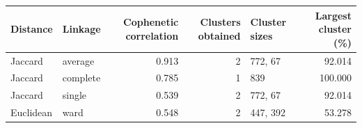 \begin{tabular}{llrrlr}
\toprule
\textbf{Distance} & \textbf{Linkage} & \textbf{Cophenetic correlation} & \textbf{Clusters obtained} & \textbf{Cluster sizes} & \textbf{Largest cluster (\%)} \\
\midrule
Jaccard & average & 0.913 & 2 & 772, 67 & 92.014 \\
Jaccard & complete & 0.785 & 1 & 839 & 100.000 \\
Jaccard & single & 0.539 & 2 & 772, 67 & 92.014 \\
Euclidean & ward & 0.548 & 2 & 447, 392 & 53.278 \\
\bottomrule
\end{tabular}
